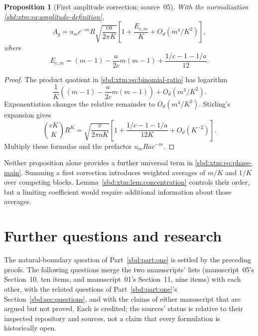 \documentclass[11pt,a4paper]{article}
\newtheorem{proposition}[theorem]{Proposition}
\theoremstyle{definition}
\begin{document}
\begin{proposition}[First amplitude correction; source~05]\label{sbd:xtm:prop:amplitude-correction}
With the normalization \eqref{sbd:xtm:eq:amplitude-definition},
\begin{equation}\label{sbd:xtm:eq:amplitude-correction}
 A_q=u_mc^{-m}R\sqrt{\frac{ca}{2\pi K}}
 \left[1+\frac{E_{c,m}}K+O_d(m^4/K^2)\right],
\end{equation}
where
\begin{equation}\label{sbd:xtm:eq:amplitude-coefficient}
 E_{c,m}=(m-1)-\frac a{2c}m(m-1)
        +\frac{1/c-1-1/a}{12}.
\end{equation}
\end{proposition}
\begin{proof}
The product quotient in \eqref{sbd:xtm:eq:binomial-ratio} has logarithm
\[
 \frac1K\left((m-1)-\frac a{2c}m(m-1)\right)
       +O_d(m^3/K^2).
\]
Exponentiation changes the relative remainder to $O_d(m^4/K^2)$. Stirling's
expansion gives
\[
 \binom{cK}{K}R^K
 =\sqrt{\frac c{2\pi aK}}
 \left[1+\frac{1/c-1-1/a}{12K}+O_d(K^{-2})\right].
\]
Multiply these formulas and the prefactor $u_mRac^{-m}$.
\end{proof}

Neither proposition alone provides a further universal term in
\eqref{sbd:xtm:eq:phase-main}. Summing a first correction introduces
weighted averages of $m/K$ and $1/K$ over competing blocks.
Lemma~\ref{sbd:xtm:lem:concentration} controls their order, but a limiting
coefficient would require additional information about those averages.


\section{Further questions and research}
\label{sbd:xtm:sec:future}

The natural-boundary question of Part~\ref{sbd:part:one} is settled by the
preceding proofs. The following questions merge the two manuscripts' lists
(manuscript~05's Section~10, ten items, and manuscript~01's Section~11,
nine items) with each other, with the related questions of
Part~\ref{sbd:part:one}'s Section~\ref{sbd:sec:questions}, and with the
claims of either manuscript that are argued but not proved. Each is
credited; the sources' status is relative to their inspected repository and
sources, not a claim that every formulation is historically open.
\end{document}
